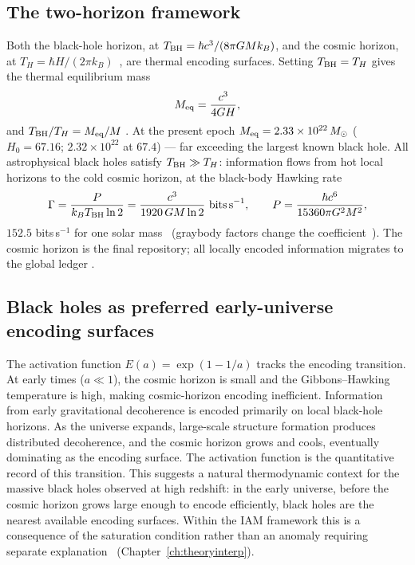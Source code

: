 \subsection{The two-horizon framework}
Both the black-hole horizon, at $T_{\rm BH}=\hbar c^3/(8\pi GMk_B)$, and the cosmic horizon, at $T_H=\hbar H/(2\pi k_B)$~\cite{GibbonsHawking1977}, are thermal
encoding surfaces. Setting $T_{\rm BH}=T_H$ gives the thermal equilibrium mass
\begin{equation}
M_{\rm eq}=\frac{c^3}{4GH}, \label{eq:law_Meq}
\end{equation}
and $T_{\rm BH}/T_H=M_{\rm eq}/M$ \derived. At the present epoch $M_{\rm eq}=2.33\times10^{22}\,M_\odot$ ($H_0=67.16$; $2.32\times10^{22}$ at $67.4$) \calc ---
far exceeding the largest known black hole. All astrophysical black holes satisfy $T_{\rm BH}\gg T_H$: information flows from hot local horizons to the cold
cosmic horizon, at the black-body Hawking rate
\begin{equation}
\Gamma=\frac{P}{k_BT_{\rm BH}\ln2}=\frac{c^3}{1920\,GM\ln2}\ \text{bits\,s}^{-1},\qquad P=\frac{\hbar c^6}{15360\pi G^2M^2}, \label{eq:law_Gamma}
\end{equation}
$152.5$ bits\,s$^{-1}$ for one solar mass \calc\ (graybody factors change the coefficient~\cite{Page1976}). The cosmic horizon is the final repository;
all locally encoded information migrates to the global ledger \interp.

\subsection{Black holes as preferred early-universe encoding surfaces}
The activation function $E(a)=\exp(1-1/a)$ tracks the encoding transition. At early times ($a\ll1$), the cosmic horizon is small and the Gibbons--Hawking
temperature is high, making cosmic-horizon encoding inefficient. Information from early gravitational decoherence is encoded primarily on local black-hole
horizons. As the universe expands, large-scale structure formation produces distributed decoherence, and the cosmic horizon grows and cools, eventually
dominating as the encoding surface. The activation function is the quantitative record of this transition. This suggests a natural thermodynamic context
for the massive black holes observed at high redshift: in the early universe, before the cosmic horizon grows large enough to encode
efficiently, black holes are the nearest available encoding surfaces. Within the IAM framework this is a consequence of the saturation condition rather
than an anomaly requiring separate explanation \interp\ (Chapter~\ref{ch:theoryinterp}).

